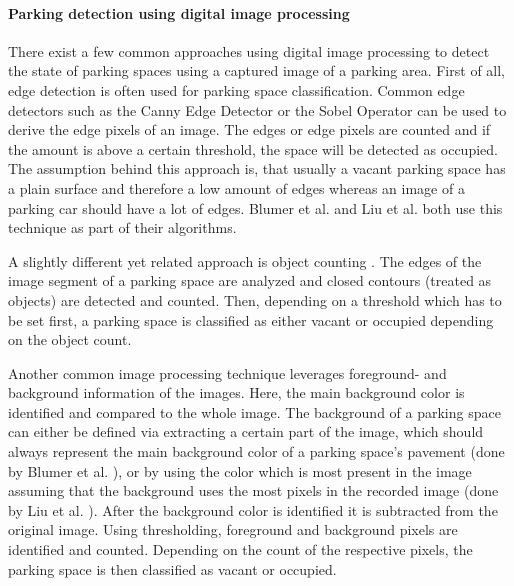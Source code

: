 \paragraph{Parking detection using digital image processing}

There exist a few common approaches using digital image processing to detect the state of parking spaces using a captured image of a parking area. First of all, edge detection is often used for parking space classification. Common edge detectors such as the Canny Edge Detector \cite{Canny1986} or the Sobel Operator \cite{Sobel} can be used to derive the edge pixels of an image. The edges or edge pixels are counted and if the amount is above a certain threshold, the space will be detected as occupied. The assumption behind this approach is, that usually a vacant parking space has a plain surface and therefore a low amount of edges whereas an image of a parking car should have a lot of edges. Blumer et al. \cite{Blumer2012} and Liu et al. \cite{stationary_camera_sensing} both use this technique as part of their algorithms.

A slightly different yet related approach is object counting \cite{stationary_camera_sensing}. The edges of the image segment of a parking space are analyzed and closed contours (treated as objects) are detected and counted. Then, depending on a threshold which has to be set first, a parking space is classified as either vacant or occupied depending on the object count.

Another common image processing technique leverages foreground- and background information of the images. Here, the main background color is identified and compared to the whole image. The background of a parking space can either be defined via extracting a certain part of the image, which should always represent the main background color of a parking space's pavement (done by Blumer et al. \cite{Blumer2012}), or by using the color which is most present in the image assuming that the background uses the most pixels in the recorded image (done by Liu et al. \cite{stationary_camera_sensing}). After the background color is identified it is subtracted from the original image. Using thresholding, foreground and background pixels are identified and counted. Depending on the count of the respective pixels, the parking space is then classified as vacant or occupied.

